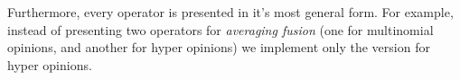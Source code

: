 \documentclass[thesis.tex]{subfiles}
\begin{document}
Furthermore, every operator is presented in it's most general
form. For example, instead of presenting two operators for
\emph{averaging fusion} (one for multinomial opinions, and another for
hyper opinions) we implement only the version for hyper opinions.




\end{document}
